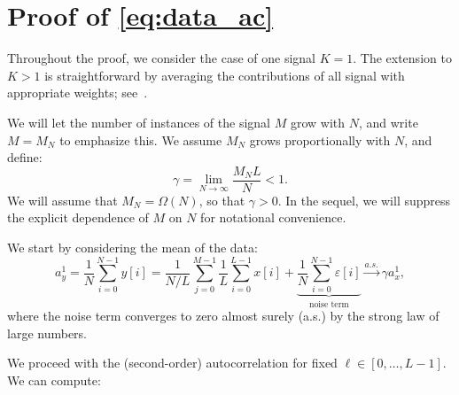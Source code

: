 \documentclass[english,11pt]{article}
\newcommand{\1}{\mathbf{1}}
\numberwithin{equation}{section}
\theoremstyle{plain}
\theoremstyle{definition}
\theoremstyle{remark}
\theoremstyle{plain}
\theoremstyle{remark}
\theoremstyle{plain}
\theoremstyle{plain}
\begin{document}








\appendix

\section{Proof of \eqref{eq:data_ac}} \label{sec:autocorrelation_computation}

Throughout the proof, we consider the case of one signal $K=1$. The extension to $K>1$ is straightforward by averaging the contributions of all signal with  appropriate weights; see~\cite{boumal2017heterogeneous}. 

We will let the number of instances of the signal $M$ grow with $N$, and write $M=M_N$ to emphasize this. We assume $M_N$ grows proportionally with $N$, and define:
%
\begin{equation}
\gamma = \lim_{N\to\infty} \frac{M_NL}{N}<1.
\end{equation}
%
We will assume that $M_N=\Omega(N)$, so that $\gamma>0$. In the sequel, we will suppress the explicit dependence of $M$ on $N$ for notational convenience.

We start by considering the mean of the data:
%
\begin{equation}
a_y^1 = \frac{1}{N}\sum_{i=0}^{N-1} y[i] =
\frac{1}{N/L}\sum_{j=0}^{M-1}\frac{1}{L}\sum_{i=0}^{L-1}x[i] +    
\underbrace{\frac{1}{N}\sum_{i=0}^{N-1}\varepsilon[i]}_{\text{noise term}}
\xrightarrow{a.s.}\gamma a_x^1,
\end{equation}
%
where the noise term converges to zero almost surely (a.s.) by the strong law of large numbers.

We proceed with the (second-order) autocorrelation for fixed $\ell\in[0,\ldots,L-1]$. We can compute:
%
\end{document}
